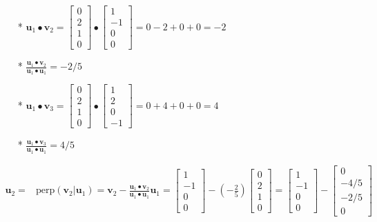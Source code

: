 \documentclass{article}
\begin{document}
\begin{description}
\begin{itemize}
\item[*] \(\mathbf{u}_1 \bullet \mathbf{v}_2 = \begin{bmatrix} 0 \\ 2 \\ 1 \\ 0 \end{bmatrix} \bullet \begin{bmatrix} 1 \\ -1 \\ 0 \\ 0 \end{bmatrix} = 0 - 2 + 0 + 0 = -2\)
\item[*] \(\frac{\mathbf{u}_1 \bullet \mathbf{v}_2}{\mathbf{u}_1 \bullet \mathbf{u}_1} = -2/5\)
\item[*] \(\mathbf{u}_1 \bullet \mathbf{v}_3 = \begin{bmatrix} 0 \\ 2 \\ 1 \\ 0 \end{bmatrix} \bullet \begin{bmatrix} 1 \\ 2 \\ 0 \\ -1 \end{bmatrix} = 0 + 4 + 0 + 0 = 4\)
\item[*] \(\frac{\mathbf{u}_1 \bullet \mathbf{v}_3}{\mathbf{u}_1 \bullet \mathbf{u}_1} = 4/5\)
\end{itemize}
\begin{align*}
\mathbf{u}_2 = & \text{perp}(\mathbf{v}_2 | \mathbf{u}_1) = \mathbf{v}_2 - \frac{\mathbf{u}_1 \bullet \mathbf{v}_2}{\mathbf{u}_1 \bullet \mathbf{u}_1}\mathbf{u}_1 
= \begin{bmatrix} 1 \\ -1 \\ 0 \\ 0 \end{bmatrix} - (-\frac{2}{5})\begin{bmatrix} 0 \\ 2 \\ 1 \\ 0 \end{bmatrix} 
= \begin{bmatrix} 1 \\ -1 \\ 0 \\ 0 \end{bmatrix} - \begin{bmatrix} 0 \\ -4/5 \\ -2/5 \\ 0 \end{bmatrix} \\

\end{align*}
\end{description}
\end{document}
